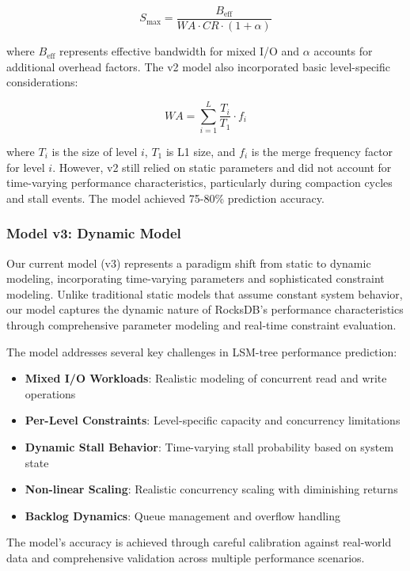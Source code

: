 \documentclass[11pt]{article}
\begin{document}
\begin{equation}
S_{\text{max}} = \frac{B_{\text{eff}}}{WA \cdot CR \cdot (1 + \alpha)}
\end{equation}

where $B_{\text{eff}}$ represents effective bandwidth for mixed I/O and $\alpha$ accounts for additional overhead factors. The v2 model also incorporated basic level-specific considerations:

\begin{equation}
WA = \sum_{i=1}^{L} \frac{T_i}{T_1} \cdot f_i
\end{equation}

where $T_i$ is the size of level $i$, $T_1$ is L1 size, and $f_i$ is the merge frequency factor for level $i$. However, v2 still relied on static parameters and did not account for time-varying performance characteristics, particularly during compaction cycles and stall events. The model achieved 75-80\% prediction accuracy.

\subsubsection{Model v3: Dynamic Model}
Our current model (v3) represents a paradigm shift from static to dynamic modeling, incorporating time-varying parameters and sophisticated constraint modeling. Unlike traditional static models that assume constant system behavior, our model captures the dynamic nature of RocksDB's performance characteristics through comprehensive parameter modeling and real-time constraint evaluation.

The model addresses several key challenges in LSM-tree performance prediction:
\begin{itemize}
    \item \textbf{Mixed I/O Workloads}: Realistic modeling of concurrent read and write operations
    \item \textbf{Per-Level Constraints}: Level-specific capacity and concurrency limitations
    \item \textbf{Dynamic Stall Behavior}: Time-varying stall probability based on system state
    \item \textbf{Non-linear Scaling}: Realistic concurrency scaling with diminishing returns
    \item \textbf{Backlog Dynamics}: Queue management and overflow handling
\end{itemize}

The model's accuracy is achieved through careful calibration against real-world data and comprehensive validation across multiple performance scenarios.
\end{document}
